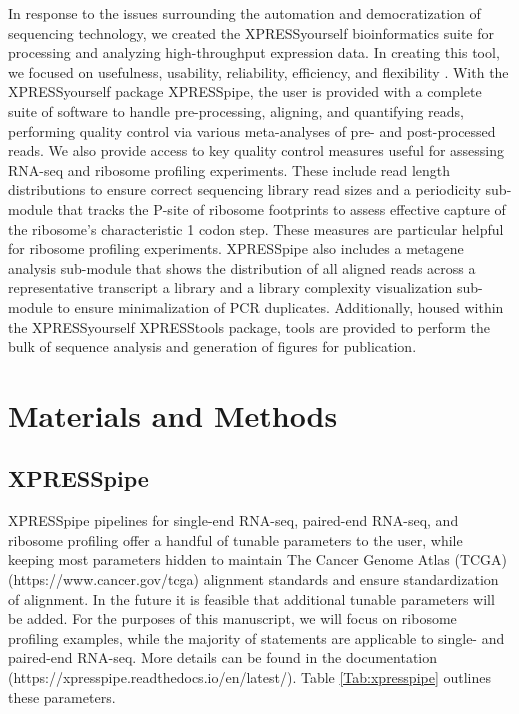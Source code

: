 \documentclass[11pt, a4paper, oneside]{article}
\begin{document}
In response to the issues surrounding the automation and democratization of sequencing technology, we created the XPRESSyourself bioinformatics suite for processing and analyzing high-throughput expression data. In creating this tool, we focused on usefulness, usability, reliability, efficiency, and flexibility \cite{taschuk_ploscb}. With the XPRESSyourself package XPRESSpipe, the user is provided with a complete suite of software to handle pre-processing, aligning, and quantifying reads, performing quality control via various meta-analyses of pre- and post-processed reads. We also provide access to key quality control measures useful for assessing RNA-seq and ribosome profiling experiments. These include read length distributions to ensure correct sequencing library read sizes and a periodicity sub-module that tracks the P-site of ribosome footprints to assess effective capture of the ribosome's characteristic 1 codon step. These measures are particular helpful for ribosome profiling experiments. XPRESSpipe also includes a metagene analysis sub-module that shows the distribution of all aligned reads across a representative transcript a library and a library complexity visualization sub-module to ensure minimalization of PCR duplicates. Additionally, housed within the XPRESSyourself XPRESStools package, tools are provided to perform the bulk of sequence analysis and generation of figures for publication.

\section{Materials and Methods}

\subsection{XPRESSpipe}
XPRESSpipe pipelines for single-end RNA-seq, paired-end RNA-seq, and ribosome profiling offer a handful of tunable parameters to the user, while keeping most parameters hidden to maintain The Cancer Genome Atlas (TCGA) (https://www.cancer.gov/tcga) alignment standards and ensure standardization of alignment. In the future it is feasible that additional tunable parameters will be added. For the purposes of this manuscript, we will focus on ribosome profiling examples, while the majority of statements are applicable to single- and paired-end RNA-seq. More details can be found in the documentation (https://xpresspipe.readthedocs.io/en/latest/). Table \ref{Tab:xpresspipe} outlines these parameters.
\end{document}
